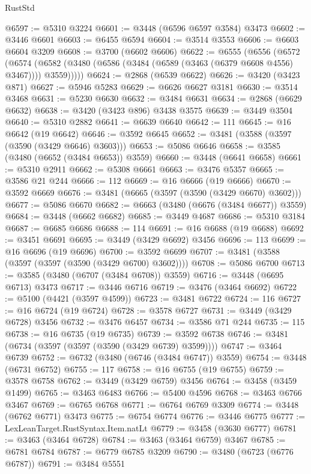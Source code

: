 \begin{lexlean}{RustStd}
\begin{coremodule}
{\begin{coremodule}
{{{{{{{{{{{{{{{{{{{{{{{{{{{{{{{{{{{{{{{{{{{{{{{{{{{{{{{{{{{{{{{{{{{{{{{{{{{{{{{{{{{{{@6597 := @5310 @3224
@6601 := @3448 (@6596 @6597 @3584) @3473
@6602 := @3446 @6601
@6603 := @6455 @6594
@6604 := @3514 @3553
@6606 := @6603 @6604 @3209
@6608 := @3700 (@6602 @6606)
@6622 := @6555
    (@6556
      (@6572
        (@6574 (@6582 (@3480 (@6586 (@3484 (@6589 (@3463 (@6379 @6608 @4556) @3467)))) @3559)))))
@6624 := @2868 (@6539 @6622)
@6626 := @3420 (@3423 @871)
@6627 := @5946 @5283
@6629 := @6626 @6627 @3181
@6630 := @3514 @3468
@6631 := @5230 @6630
@6632 := @3484 @6631
@6634 := @2868 (@6629 @6632)
@6638 := @3420 (@3423 @896) @3438 @3575
@6639 := @3449 @3504
@6640 := @5310 @2882
@6641 := @6639 @6640
@6642 := 111
@6645 := @16 @6642 (@19 @6642)
@6646 := @3592 @6645
@6652 := @3481 (@3588 (@3597 (@3590 (@3429 @6646) @3603)))
@6653 := @5086 @6646
@6658 := @3585 (@3480 (@6652 (@3484 @6653)) @3559)
@6660 := @3448 (@6641 @6658)
@6661 := @5310 @2911
@6662 := @5308 @6661
@6663 := @3476 @5357
@6665 := @3586 @21 @244
@6666 := 112
@6669 := @16 @6666 (@19 @6666)
@6670 := @3592 @6669
@6676 := @3481 (@6665 (@3597 (@3590 (@3429 @6670) @3602)))
@6677 := @5086 @6670
@6682 := @6663 (@3480 (@6676 (@3484 @6677)) @3559)
@6684 := @3448 (@6662 @6682)
@6685 := @3449 @4687
@6686 := @5310 @3184
@6687 := @6685 @6686
@6688 := 114
@6691 := @16 @6688 (@19 @6688)
@6692 := @3451 @6691
@6695 := @3449 (@3429 @6692) @3456
@6696 := 113
@6699 := @16 @6696 (@19 @6696)
@6700 := @3592 @6699
@6707 := @3481 (@3588 (@3597 (@3597 (@3590 (@3429 @6700) @3602))))
@6708 := @5086 @6700
@6713 := @3585 (@3480 (@6707 (@3484 @6708)) @3559)
@6716 := @3448 (@6695 @6713) @3473
@6717 := @3446 @6716
@6719 := @3476 (@3464 @6692)
@6722 := @5100 (@4421 (@3597 @4599))
@6723 := @3481 @6722
@6724 := 116
@6727 := @16 @6724 (@19 @6724)
@6728 := @3578 @6727
@6731 := @3449 (@3429 @6728) @3456
@6732 := @3476 @6457
@6734 := @3586 @71 @244
@6735 := 115
@6738 := @16 @6735 (@19 @6735)
@6739 := @3592 @6738
@6746 := @3481 (@6734 (@3597 (@3597 (@3590 (@3429 @6739) @3599))))
@6747 := @3464 @6739
@6752 := @6732 (@3480 (@6746 (@3484 @6747)) @3559)
@6754 := @3448 (@6731 @6752)
@6755 := 117
@6758 := @16 @6755 (@19 @6755)
@6759 := @3578 @6758
@6762 := @3449 (@3429 @6759) @3456
@6764 := @3458 (@3459 @1499)
@6765 := @3463 @6483
@6766 := @5400 @4596
@6768 := @3463 @6766 @3467
@6769 := @6765 @6768
@6771 := @6764 @6769 @3309
@6774 := @3448 (@6762 @6771) @3473
@6775 := @6754 @6774
@6776 := @3446 @6775
@6777 := LexLeanTarget.RustSyntax.Item.natLt
@6779 := @3458 (@3630 @6777)
@6781 := @3463 (@3464 @6728)
@6784 := @3463 (@3464 @6759) @3467
@6785 := @6781 @6784
@6787 := @6779 @6785 @3209
@6790 := @3480 (@6723 (@6776 @6787))
@6791 := @3484 @5551
}}}}}}}}}}}}}}}}}}}}}}}}}}}}}}}}}}}}}}}}}}}}}}}}}}}}}}}}}}}}}}}}}}}}}}}}}}}}}}}}}}}}}
\end{coremodule}}
\end{coremodule}
\end{lexlean}
